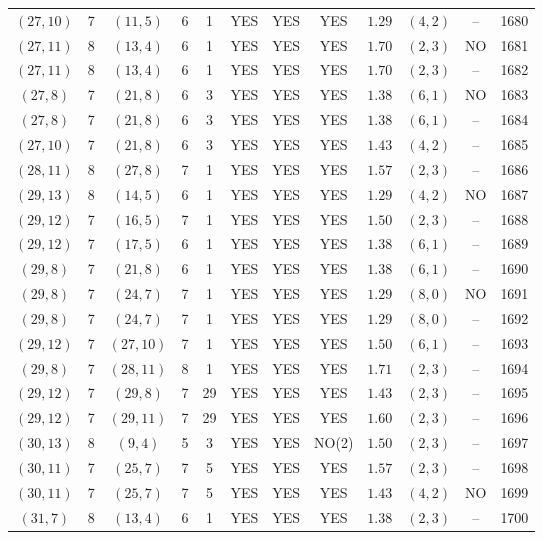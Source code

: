 \begin{longtable}{|c|c|c|c|c|c|c|c|c|c|c|c|}
$(27,10)$ & 7 & $(11,5)$ & 6 & 1 & YES & YES & YES & $1.29$ & $(4,2)$ & -- & 1680\\
$(27,11)$ & 8 & $(13,4)$ & 6 & 1 & YES & YES & YES & $1.70$ & $(2,3)$ & NO & 1681\\
$(27,11)$ & 8 & $(13,4)$ & 6 & 1 & YES & YES & YES & $1.70$ & $(2,3)$ & -- & 1682\\
$(27,8)$ & 7 & $(21,8)$ & 6 & 3 & YES & YES & YES & $1.38$ & $(6,1)$ & NO & 1683\\
$(27,8)$ & 7 & $(21,8)$ & 6 & 3 & YES & YES & YES & $1.38$ & $(6,1)$ & -- & 1684\\
$(27,10)$ & 7 & $(21,8)$ & 6 & 3 & YES & YES & YES & $1.43$ & $(4,2)$ & -- & 1685\\
$(28,11)$ & 8 & $(27,8)$ & 7 & 1 & YES & YES & YES & $1.57$ & $(2,3)$ & -- & 1686\\
$(29,13)$ & 8 & $(14,5)$ & 6 & 1 & YES & YES & YES & $1.29$ & $(4,2)$ & NO & 1687\\
$(29,12)$ & 7 & $(16,5)$ & 7 & 1 & YES & YES & YES & $1.50$ & $(2,3)$ & -- & 1688\\
$(29,12)$ & 7 & $(17,5)$ & 6 & 1 & YES & YES & YES & $1.38$ & $(6,1)$ & -- & 1689\\
$(29,8)$ & 7 & $(21,8)$ & 6 & 1 & YES & YES & YES & $1.38$ & $(6,1)$ & -- & 1690\\
$(29,8)$ & 7 & $(24,7)$ & 7 & 1 & YES & YES & YES & $1.29$ & $(8,0)$ & NO & 1691\\
$(29,8)$ & 7 & $(24,7)$ & 7 & 1 & YES & YES & YES & $1.29$ & $(8,0)$ & -- & 1692\\
$(29,12)$ & 7 & $(27,10)$ & 7 & 1 & YES & YES & YES & $1.50$ & $(6,1)$ & -- & 1693\\
$(29,8)$ & 7 & $(28,11)$ & 8 & 1 & YES & YES & YES & $1.71$ & $(2,3)$ & -- & 1694\\
$(29,12)$ & 7 & $(29,8)$ & 7 & 29 & YES & YES & YES & $1.43$ & $(2,3)$ & -- & 1695\\
$(29,12)$ & 7 & $(29,11)$ & 7 & 29 & YES & YES & YES & $1.60$ & $(2,3)$ & -- & 1696\\
$(30,13)$ & 8 & $(9,4)$ & 5 & 3 & YES & YES & NO(2) & $1.50$ & $(2,3)$ & -- & 1697\\
$(30,11)$ & 7 & $(25,7)$ & 7 & 5 & YES & YES & YES & $1.57$ & $(2,3)$ & -- & 1698\\
$(30,11)$ & 7 & $(25,7)$ & 7 & 5 & YES & YES & YES & $1.43$ & $(4,2)$ & NO & 1699\\
$(31,7)$ & 8 & $(13,4)$ & 6 & 1 & YES & YES & YES & $1.38$ & $(2,3)$ & -- & 1700\\

\end{longtable}
